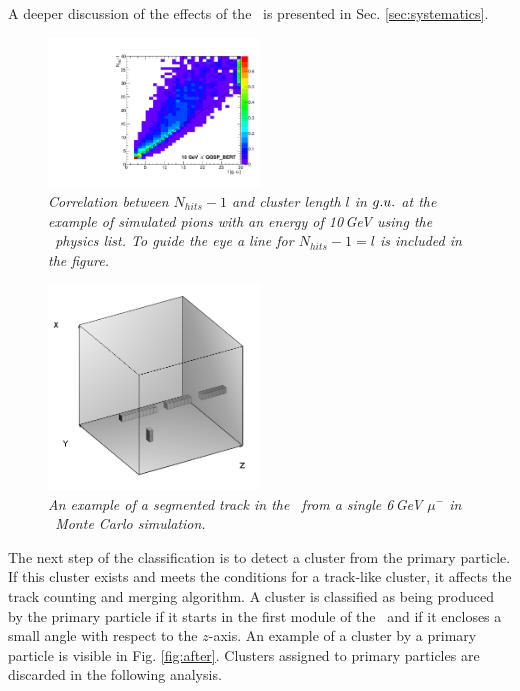 A deeper discussion of the effects of the  \ep\ is presented in Sec. \ref{sec:systematics}. 

\begin{figure}[H]
	\centering
	\includegraphics[width=0.5\textwidth]{ECAL/plots/l-nhits.pdf}
	\caption{\label{fig:lnhits} \sl Correlation between $N_{hits} - 1$ and cluster length $l$ in ${\sl g.u.}$ at the example of simulated pions with an energy of 10\,GeV using the \qgsp\ physics list. To guide the eye a line for $N_{hits} - 1=l$ is included in the figure.}
\end{figure}


\begin{figure}[H]
	\centering
	\includegraphics[width=0.5\textwidth]{ECAL/graphics/segmented-track-example.png}
	\caption{\label{fig:demomerge} \sl An example of a segmented track in the \ecal\ from a single 6\,GeV $\mu^-$ in \ftfp\ Monte Carlo simulation.}
\end{figure}
The next step of the classification is to detect a cluster from the primary particle. 
If this cluster exists and meets the conditions for a track-like cluster, it affects the track counting and merging algorithm.
A cluster is classified as being produced by the primary particle if it starts in the first module of the \ecal\ and if it encloses a small angle with respect to the $z$-axis. 
An example of a cluster by a primary particle is visible in Fig. \ref{fig:after}. Clusters assigned to primary particles are discarded in the following analysis. 

